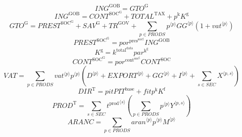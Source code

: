 \begin{equation}
{I\!N\!G}^{\mathrm{GOB}} = {G\!T\!O}^{\mathrm{G}}
\end{equation}
\begin{equation}
{I\!N\!G}^{\mathrm{GOB}} = {C\!O\!N\!T}^{\mathrm{SOC}^{\mathrm{G}}} + {T\!O\!T\!A\!L}^{\mathrm{TAX}} + {p^{\mathrm{k}}} {K^{\mathrm{g}}}
\end{equation}
\begin{equation}
{G\!T\!O}^{\mathrm{G}} = {P\!R\!E\!S\!T}^{\mathrm{SOC}^{\mathrm{G}}} + {S\!A\!V}^{\mathrm{G}} + {T\!R}^{\mathrm{GOV}} + \sum_{p\in {P\!R\!O\!D\!S}} {{p}^{\langle p\rangle}} {{{G\!G}}^{\langle p\rangle}} \left(1 + {{v\!a\!t}}^{\langle p\rangle}\right)
\end{equation}
\begin{equation}
{P\!R\!E\!S\!T}^{\mathrm{SOC}^{\mathrm{G}}} = {{p\!o\!r}^{\mathrm{pres}^{\mathrm{soc}^{\mathrm{g}}}}} {{I\!N\!G}^{\mathrm{GOB}}}
\end{equation}
\begin{equation}
K^{\mathrm{g}} = {k^{\mathrm{total}^{\mathrm{data}}}} {{p\!a\!r}^{\mathrm{k}^{\mathrm{g}}}}
\end{equation}
\begin{equation}
{C\!O\!N\!T}^{\mathrm{SOC}^{\mathrm{G}}} = {{p\!o\!r}^{\mathrm{cont}^{\mathrm{soc}^{\mathrm{g}}}}} {{C\!O\!N\!T}^{\mathrm{SOC}}}
\end{equation}
\begin{equation}
{V\!A\!T} = \sum_{p\in {P\!R\!O\!D\!S}} {{{v\!a\!t}}^{\langle p\rangle}} {{p}^{\langle p\rangle}} \left({D}^{\langle p\rangle} + {{E\!X\!P\!O\!R\!T}}^{\langle p\rangle} + {{G\!G}}^{\langle p\rangle} + {I}^{\langle p\rangle} + \sum_{s\in {S\!E\!C}} {X}^{\langle p,s\rangle}\right)
\end{equation}
\begin{equation}
{D\!I\!R}^{\mathrm{T}} = {{p\!i\!t}} {{P\!I\!T}^{\mathrm{base}}} + {{f\!i\!t}} {p^{\mathrm{k}}} {K^{\mathrm{f}}}
\end{equation}
\begin{equation}
{P\!R\!O\!D}^{\mathrm{T}} = \sum_{s\in {S\!E\!C}} {{t^{\mathrm{prod}}}^{\langle s\rangle}} \left(\sum_{p\in {P\!R\!O\!D\!S}} {{p}^{\langle p\rangle}} {{Y}^{\langle p,s\rangle}}\right)
\end{equation}
\begin{equation}
{A\!R\!A\!N\!C} = \sum_{p\in {P\!R\!O\!D\!S}} {{{a\!r\!a\!n}}^{\langle p\rangle}} {{p}^{\langle p\rangle}} {{M}^{\langle p\rangle}}
\end{equation}
